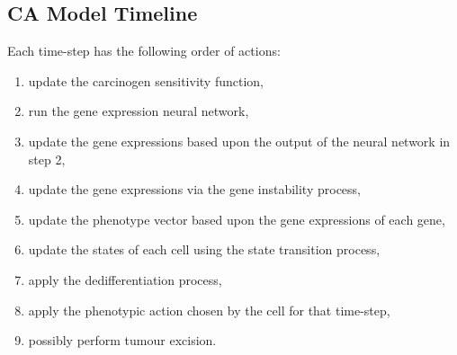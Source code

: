 \documentclass[\main/thesis.tex]{subfiles}
\begin{document}
\subsection{CA Model Timeline}
Each time-step has the following order of actions:
\begin{enumerate}
    \item update the carcinogen sensitivity function,
    \item run the gene expression neural network,
    \item update the gene expressions based upon the output of the neural network in step 2,
    \item update the gene expressions via the gene instability process,
    \item update the phenotype vector based upon the gene expressions of each gene,
    \item update the states of each cell using the state transition process,
    \item apply the dedifferentiation process,
    \item apply the phenotypic action chosen by the cell for that time-step,
    \item possibly perform tumour excision.
\end{enumerate}
\end{document}
